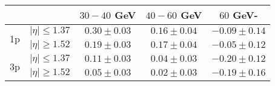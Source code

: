 \centering
\begin{tabular}{ccccc} \toprule\toprule
                  &  & $30-40$ GeV & $40-60$ GeV & $60$ GeV-  \\ \midrule
\multirow{2}{*}{1p} &$\lvert \eta \rvert \leq 1.37$ & $0.30\pm0.03$ & $0.16\pm0.04$ & $-0.09\pm0.14$\\\cline{2-5}
                    &$\lvert \eta \rvert \geq 1.52$ & $0.19\pm0.03$ & $0.17\pm0.04$ & $-0.05\pm0.12$\\
\multirow{2}{*}{3p} &$\lvert \eta \rvert \leq 1.37$ & $0.11\pm0.03$ & $0.04\pm0.03$ & $-0.20\pm0.12$\\\cline{2-5}
                    &$\lvert \eta \rvert \geq 1.52$ & $0.05\pm0.03$ & $0.02\pm0.03$ & $-0.19\pm0.16$\\
\bottomrule\bottomrule 
\end{tabular}